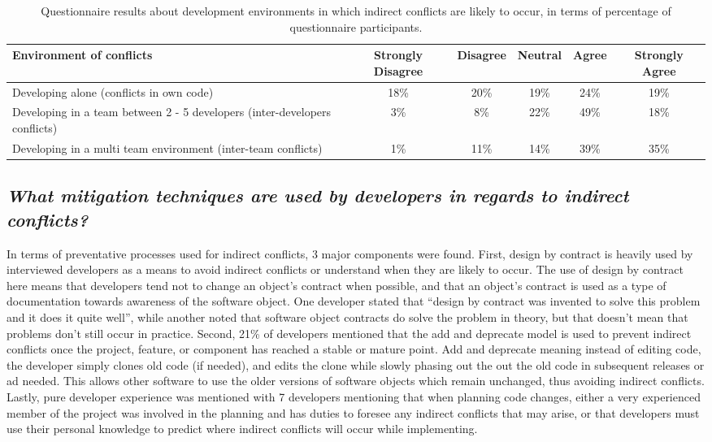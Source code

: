 \documentclass[conference]{IEEEtran}
\begin{document}
\begin{table*}[tb!]
\begin{center}
\begin{tabular}{| p{7cm} | c | c | c | c | c |}
\hline
Environment of conflicts & Strongly Disagree & Disagree & Neutral & Agree & Strongly Agree \\
\hline
\hline
Developing alone (conflicts in own code) & 18\% & 20\% & 19\% & 24\% & 19\% \\ \hline
Developing in a team between 2 - 5 developers (inter-developers conflicts) & 3\% & 8\% & 22\% & 49\% & 18\% \\ \hline
Developing in a multi team environment (inter-team conflicts) & 1\% & 11\% & 14\% & 39\% & 35\% \\ \hline
\end{tabular}
\end{center}
\caption{Questionnaire results about development environments in which indirect conflicts are likely to occur, in terms of percentage
of questionnaire participants.\label{tab:env}}
\end{table*}

{}
\subsection*{ \it{What mitigation techniques are used by developers in regards to indirect conflicts?}}

In terms of preventative processes used for indirect conflicts, 3 major components were found.
First, design by contract is heavily used by interviewed developers as a means to avoid indirect conflicts or understand
when they are likely to occur. The use of design by contract here means that developers tend not to change an object's
contract when possible, and that an object's contract is used as a type of documentation towards awareness of the
software object. One developer stated that ``design by contract was invented to solve this problem and it does it
quite well'', while another noted that software object contracts do solve the problem in theory, but that doesn't
mean that problems don't still occur in practice.
Second, 21\% of developers mentioned that the add and deprecate
model is used to prevent indirect conflicts once
the project, feature, or component has reached a stable or mature point.
Add and deprecate meaning instead of editing code, the developer simply clones old code (if needed), and edits the clone
while slowly phasing out the out the old code in subsequent releases or ad needed. This allows other software to
use the older versions of software objects which remain unchanged, thus avoiding indirect conflicts.
Lastly, pure developer experience was mentioned with 7 developers mentioning that when planning code changes,
either a very experienced member of the project was involved in the planning and has duties to foresee any
indirect conflicts that may arise, or that developers must use their personal knowledge to predict where indirect
conflicts will occur while implementing.
\end{document}
